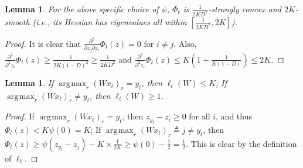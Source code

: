 \documentclass{article}
\newcommand{\e}{\mathbf{e}}
\newtheorem{lemma}[theorem]{Lemma}
\newtheorem{definition}[theorem]{Definition}
\DeclareMathOperator*{\argmax}{\arg\!\max}
\begin{document}
\begin{lemma} 
 For the above specific choice of $\psi$, $\Phi_t$ is $\frac{1}{2KD^2}$-strongly convex and $2K$-smooth (i.e., its Hessian has eigenvalues all within $[\frac{1}{2KD^2}, 2K]$). 
 
\end{lemma}
\begin{proof}
It is clear that $\frac{\partial^2}{\partial z_j\partial z_i}\Phi_t(z)=0$ for $i\neq j$. Also, $\frac{\partial^2}{\partial^2 z_i} \Phi_t(z)\geq \frac{1}{2K(1-D)^2}\geq \frac{1}{2KD^2}$ and $\frac{\partial^2}{\partial^2 z_i} \Phi_t(z)\leq K\left(1+\frac{1}{K(1-D)}\right)\leq 2K$. 
\end{proof}

\begin{lemma}
\label{lemma:error_cond}
If $\argmax_r (Wx_t)_r = y_t$, then $\ell_t(W) \leq K$; 
If $\argmax_r (Wx_t)_r \neq y_t$, then $\ell_t(W) \geq 1$.  
\end{lemma}
\begin{proof}
If $\argmax_r (Wx_t)_r = y_t$, then $z_{y_t}-z_i\geq 0$ for all $i$, and thus $\Phi_t(z)< K\psi(0)=K$; 
If $\argmax_r (Wx_t)_r \triangleq j \neq y_t$, then $\Phi_t(z)\geq \psi(z_{y_t}-z_j) - K\times \frac{1}{2K}\geq \psi(0)-\frac{1}{2}=\frac{1}{2}$. 
This is clear by the definition of $\ell_t$. 
\end{proof}
\fi
\end{document}
